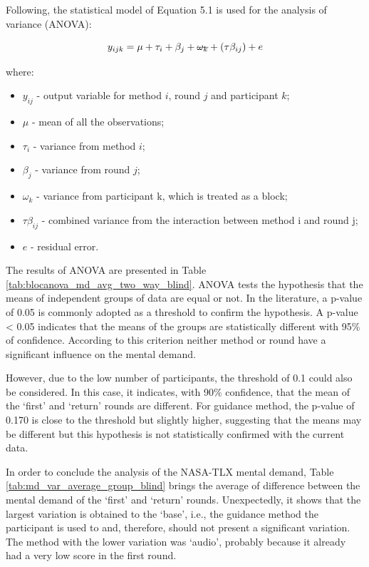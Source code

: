 Following, the statistical model of Equation 5.1 is used for the analysis of variance (ANOVA): 

\begin{equation}
    \label{eq:statistical_model}
    y_{ijk} = \mu + \tau_i + \beta_j + \msout{\omega_k} + (\tau\beta_{ij}) + e
\end{equation}

where:

\begin{itemize}
    \item $y_{ij}$ - output variable for method $i$, round $j$ and participant $k$;
    \item $\mu$ - mean of all the observations;
    \item $\tau_i$ - variance from method $i$;
    \item $\beta_j$ - variance from round $j$;
    \item \sout{$\omega_k$} - variance from participant k, which is treated as a block;
    \item $\tau\beta_{ij}$ - combined variance from the interaction between method i and round j;
    \item $e$ - residual error.
\end{itemize}

The results of ANOVA are presented in Table \ref{tab:blocanova_md_avg_two_way_blind}. ANOVA tests the hypothesis that the means of independent groups of data are equal or not. In the literature, a p-value of 0.05 is commonly adopted as a threshold to confirm the hypothesis. A p-value < 0.05 indicates that the means of the groups are statistically different with 95\% of confidence. According to this criterion neither method or round have a significant influence on the mental demand.

However, due to the low number of participants, the threshold of 0.1 could also be considered. In this case, it indicates, with 90\% confidence, that the mean of the ‘first’ and ‘return’ rounds are different. For guidance method, the p-value of 0.170 is close to the threshold but slightly higher, suggesting that the means may be different but this hypothesis is not statistically confirmed with the current data. 



In order to conclude the analysis of the NASA-TLX mental demand, Table \ref{tab:md_var_average_group_blind} brings the average of difference between the mental demand of the ‘first’ and ‘return’ rounds. Unexpectedly, it shows that the largest variation is obtained to the ‘base’, i.e., the guidance method the participant is used to and, therefore, should not present a significant variation. The method with the lower variation was ‘audio’, probably because it already had a very low score in the first round. 

